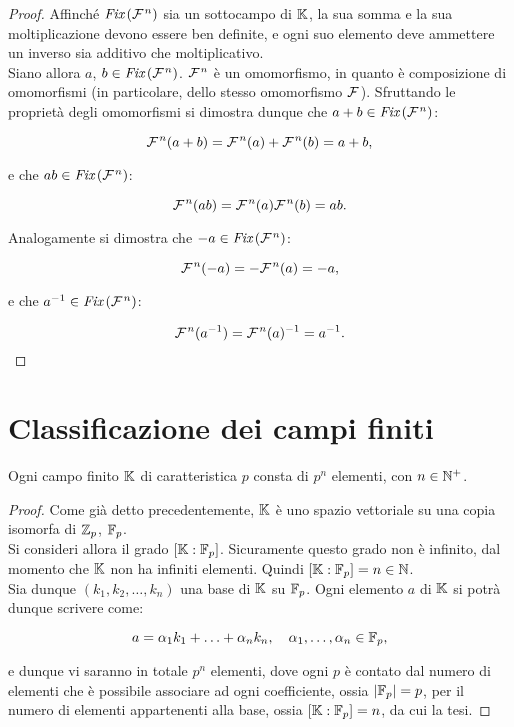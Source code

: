 \begin{proof}
    Affinché $\operatorname{\textit{Fix}\,}(\mathcal{F}{\mkern 1.5mu}^n)$ sia un sottocampo di $\mathbb{K}$,
    la sua somma e la sua moltiplicazione devono essere ben
    definite, e ogni suo elemento deve ammettere un inverso
    sia additivo che moltiplicativo. \\

    Siano allora $a$, $b \in \operatorname{\textit{Fix}\,}(\mathcal{F}{\mkern 1.5mu}^n)$.
    $\mathcal{F}{\mkern 1.5mu}^n$ è un omomorfismo, in quanto è composizione
    di omomorfismi (in particolare, dello stesso omomorfismo
    $\mathcal{F}{\mkern 1.5mu}$). Sfruttando le proprietà
    degli omomorfismi si dimostra dunque
    che $a+b \in \operatorname{\textit{Fix}\,}(\mathcal{F}{\mkern 1.5mu}^n)$:

    \[ \mathcal{F}{\mkern 1.5mu}^n(a+b) = \mathcal{F}{\mkern 1.5mu}^n(a) + \mathcal{F}{\mkern 1.5mu}^n(b) = a+b, \]

    \vskip 0.1in

    e che $ab \in \operatorname{\textit{Fix}\,}(\mathcal{F}{\mkern 1.5mu}^n)$:

    \[ \mathcal{F}{\mkern 1.5mu}^n(ab) = \mathcal{F}{\mkern 1.5mu}^n(a)\mathcal{F}{\mkern 1.5mu}^n(b) = ab. \]

    \vskip 0.1in

    Analogamente si dimostra che $-a \in \operatorname{\textit{Fix}\,}(\mathcal{F}{\mkern 1.5mu}^n)$:

    \[ \mathcal{F}{\mkern 1.5mu}^n(-a) = -\mathcal{F}{\mkern 1.5mu}^n(a) = -a, \]

    \vskip 0.1in

    e che $a^{-1} \in \operatorname{\textit{Fix}\,}(\mathcal{F}{\mkern 1.5mu}^n)$:

    \[ \mathcal{F}{\mkern 1.5mu}^n(a^{-1}) = \mathcal{F}{\mkern 1.5mu}^n(a)^{-1} = a^{-1}. \]

\end{proof}


\section{Classificazione dei campi finiti}

\begin{theorem}
    Ogni campo finito $\mathbb{K}$ di caratteristica $p$ consta
    di $p^n$ elementi, con $n \in \mathbb N^+$.
\end{theorem}

\begin{proof}
    Come già detto precedentemente, $\mathbb{K}$ è uno
    spazio vettoriale su una copia isomorfa di $\mathbb{Z}_p$,
    $\mathbb{F}_p$. \\

    Si consideri allora il grado $[\mathbb{K} : \mathbb{F}_p]$. Sicuramente
    questo grado non è infinito, dal momento che $\mathbb{K}$ non
    ha infiniti elementi. Quindi $[\mathbb{K} : \mathbb{F}_p] = n \in \mathbb N$. \\

    Sia dunque $(k_1, k_2, \ldots, k_n)$ una base di $\mathbb{K}$
    su $\mathbb{F}_p$. Ogni elemento $a$ di $\mathbb{K}$ si potrà dunque scrivere
    come:

    \[ a = \alpha_1 k_1 + \ldots + \alpha_n k_n, \quad \alpha_1, \ldots, \alpha_n \in \mathbb{F}_p,\]

    \vskip 0.1in

    e dunque vi saranno in totale $p^n$
    elementi, dove ogni $p$ è contato dal numero di elementi che è
    possibile associare ad ogni coefficiente, ossia $\left|\mathbb{F}_p\right| = p$,
    per il numero di elementi appartenenti alla base, ossia $[\mathbb{K} : \mathbb{F}_p] =
        n$, da cui la tesi.
\end{proof}

